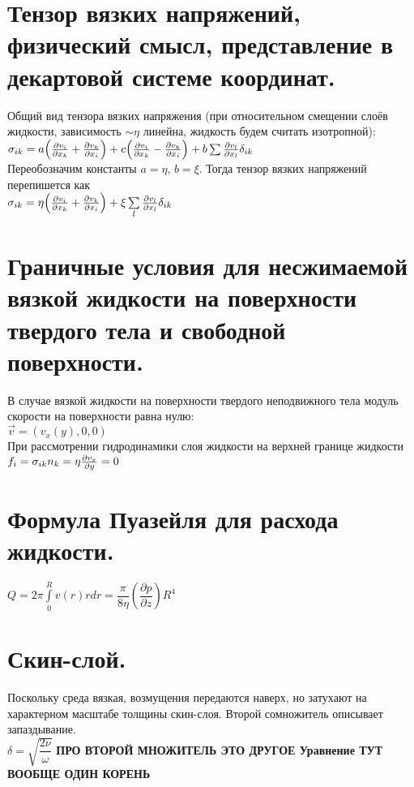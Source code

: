 \begin{multicols*}{3}
		\section{Тензор вязких напряжений, физический смысл, представление в декартовой системе координат.}
		Общий вид тензора вязких напряжения (при относительном смещении слоёв жидкости, зависимость $\sim\eta$ линейна, жидкость будем считать изотропной): \\
		$\sigma_{ik} = a\qty(\pdv{v_i}{x_k}+\pdv{v_k}{x_i})+c\qty(\pdv{v_i}{x_k}-\pdv{v_k}{x_i})+b\sum \pdv{v_l}{x_l} \delta_{ik}$ \\
		Переобозначим константы $a=\eta$, $b=\xi$. Тогда тензор вязких напряжений перепишется как\\
		$ \sigma_{ik} = \eta \qty(\pdv{v_i}{x_k}+\pdv{v_k}{x_i})+\xi \sum\limits_l \pdv{v_l}{x_l} \delta_{ik} $
	
		\section{Граничные условия для несжимаемой вязкой жидкости на поверхности твердого тела и свободной поверхности.}
		В случае вязкой жидкости на поверхности твердого неподвижного тела модуль скорости на поверхности равна нулю: \\
		$ \vec{v}= (v_x (y),0,0) $\\
		При рассмотрении гидродинамики слоя жидкости на верхней границе жидкости \\
		$ f_i = \sigma_{ik} n_k = \eta\pdv{v_x}{y} = 0 $
		
		\section{Формула Пуазейля для расхода жидкости.}
		$Q=2\pi\int\limits_0^Rv(r)rdr=\dfrac{\pi}{8\eta}\left(\dfrac{\partial p}{\partial z}\right)R^4$ \\
		
		\section{Скин-слой.}
		Поскольку среда вязкая, возмущения передаются наверх, но затухают на характерном масштабе толщины скин-слоя. Второй сомножитель описывает запаздывание. \\
		$\delta=\sqrt{\dfrac{2\nu}{\omega}}$
		\textbf{ПРО ВТОРОЙ МНОЖИТЕЛЬ ЭТО ДРУГОЕ Уравнение ТУТ ВООБЩЕ ОДИН КОРЕНЬ}
		

\end{multicols*}
